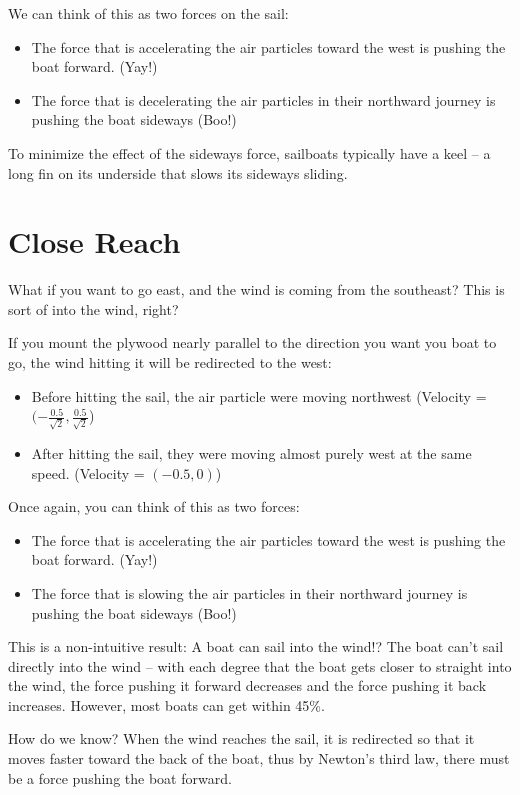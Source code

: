We can think of this as two forces on the sail: 
\begin{itemize}
\item The force that is accelerating the air particles toward the west is pushing the boat forward.  (Yay!)
\item The force that is decelerating the air particles in their northward journey is pushing the boat sideways (Boo!)
\end{itemize}

To minimize the effect of the sideways force,  sailboats typically have  a keel -- a long fin on its underside that slows its sideways sliding.

\section{Close Reach}

What if you want to go east,  and the wind is coming from the southeast?  This is sort of into the wind,  right?

If you mount the plywood nearly parallel to the direction you want you boat to go,  the wind hitting it will be redirected to the west:

\begin{itemize}
\item Before hitting the sail,  the air particle were moving northwest (Velocity = $(-\frac{0.5}{\sqrt{2}}, \frac{0.5}{\sqrt{2}}$)
\item After hitting the sail,  they were moving almost purely west at the same speed.  (Velocity = $(-0.5,0)$)
\end{itemize}

Once again, you can think of this as two forces: 
\begin{itemize}
\item The force that is accelerating the air particles toward the west is pushing the boat forward.  (Yay!)
\item The force that is slowing the air particles in their northward journey is pushing the boat sideways (Boo!)
\end{itemize}

This is a non-intuitive result: A boat can sail into the wind!?  The boat can't sail directly into the wind -- with each degree that the boat gets closer
to straight into the wind,  the force pushing it forward decreases and the force pushing it back increases.   However,  most boats can get within 45\%.

How do we know?  When the wind reaches the sail,  it is redirected so that it moves faster toward the back of the boat,   thus by Newton's third law,  there must be a force pushing the boat forward.

